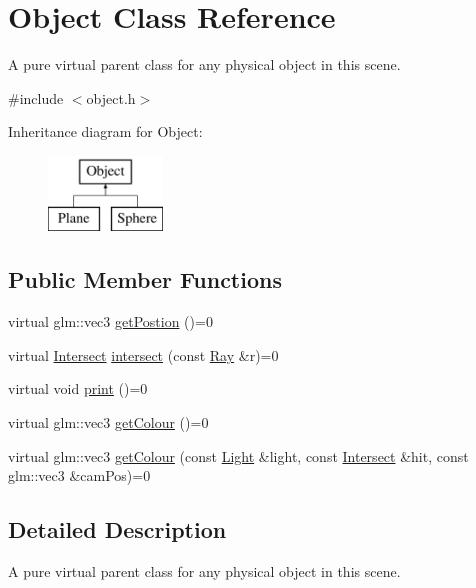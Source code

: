 \hypertarget{class_object}{}\section{Object Class Reference}
\label{class_object}


A pure virtual parent class for any physical object in this scene.  




{\ttfamily \#include $<$object.\+h$>$}

Inheritance diagram for Object\+:\begin{figure}[H]
\begin{center}
\leavevmode
\includegraphics[height=2.000000cm]{class_object}
\end{center}
\end{figure}
\subsection*{Public Member Functions}
\begin{DoxyCompactItemize}
\item 
virtual glm\+::vec3 \mbox{\hyperlink{class_object_ac29e04a255155b791d69b97820423efa}{get\+Postion}} ()=0
\item 
virtual \mbox{\hyperlink{struct_intersect}{Intersect}} \mbox{\hyperlink{class_object_a27b26f69f1fcb4dc72eca40ac0d20ea6}{intersect}} (const \mbox{\hyperlink{struct_ray}{Ray}} \&r)=0
\item 
virtual void \mbox{\hyperlink{class_object_ad81452e5a38455eff025d85ef1da7307}{print}} ()=0
\item 
virtual glm\+::vec3 \mbox{\hyperlink{class_object_a0a966fb37be861cbaacb834ef7b89d8a}{get\+Colour}} ()=0
\item 
virtual glm\+::vec3 \mbox{\hyperlink{class_object_aac162b545913d7aeab851204d3f04ebf}{get\+Colour}} (const \mbox{\hyperlink{class_light}{Light}} \&light, const \mbox{\hyperlink{struct_intersect}{Intersect}} \&hit, const glm\+::vec3 \&cam\+Pos)=0
\end{DoxyCompactItemize}


\subsection{Detailed Description}
A pure virtual parent class for any physical object in this scene. 

